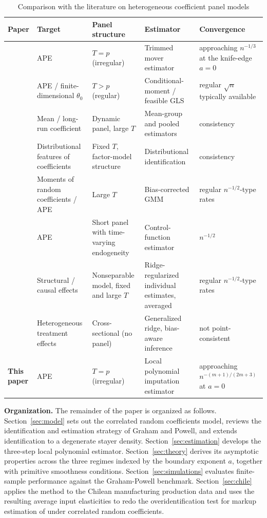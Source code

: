 \documentclass{article}
\begin{document}
\begin{table}[H]
\centering
\caption{Comparison with the literature on heterogeneous coefficient panel models}
\label{tab:litreview}
\small
\singlespacing
\begin{tabular}{@{}L{3.3cm}L{2.6cm}L{2.9cm}L{3.3cm}L{2.7cm}@{}}
\toprule
\textbf{Paper} & \textbf{Target} & \textbf{Panel structure} & \textbf{Estimator} & \textbf{Convergence} \\
\midrule
\cite{grahampowell} & APE & $T=p$ (irregular) & Trimmed mover estimator & approaching $n^{-1/3}$ at the knife-edge $a=0$ \\[4pt]
\cite{CHAMBERLAIN1982,CHAMBERLAIN1987,CHAMBERLAIN1992} & APE / finite-dimensional $\theta_0$ & $T>p$ (regular) & Conditional-moment / feasible GLS & regular $\sqrt{n}$ typically available \\[4pt]
\cite{PESARAN199579} & Mean / long-run coefficient & Dynamic panel, large $T$ & Mean-group and pooled estimators & consistency \\[4pt]
\cite{ArellanoB2012} & Distributional features of coefficients & Fixed $T$, factor-model structure & Distributional identification & consistency \\[4pt]
\cite{CorrelatedPanelModelLargeT} & Moments of random coefficients / APE & Large $T$ & Bias-corrected GMM & regular $n^{-1/2}$-type rates \\[4pt]
\cite{LAAGE2024105804} & APE & Short panel with time-varying endogeneity & Control-function estimator & $n^{-1/2}$ \\[4pt]
\cite{hausman2025linear} & Structural / causal effects & Nonseparable model, fixed and large $T$ & Ridge-regularized individual estimates, averaged & regular $n^{-1/2}$-type rates \\[4pt]
\cite{kwon2026estimatingtreatmenteffectsbounded} & Heterogeneous treatment effects & Cross-sectional (no panel) & Generalized ridge, bias-aware inference & not point-consistent \\[4pt]
\textbf{This paper} & APE & $T=p$ (irregular) & Local polynomial imputation estimator & approaching $n^{-(m+1)/(2m+3)}$ at $a=0$ \\
\bottomrule
\end{tabular}
\end{table}

\textbf{Organization.} The remainder of the paper is organized as follows. Section~\ref{sec:model} sets out the correlated random coefficients model, reviews the identification and estimation strategy of Graham and Powell, and extends identification to a degenerate stayer density. Section~\ref{sec:estimation} develops the three-step local polynomial estimator. Section~\ref{sec:theory} derives its asymptotic properties across the three regimes indexed by the boundary exponent $a$, together with primitive smoothness conditions. Section~\ref{sec:simulations} evaluates finite-sample performance against the Graham-Powell benchmark. Section~\ref{sec:chile} applies the method to the Chilean manufacturing production data and uses the resulting average input elasticities to redo the overidentification test for markup estimation of \cite{Raval2023} under correlated random coefficients.
\end{document}
